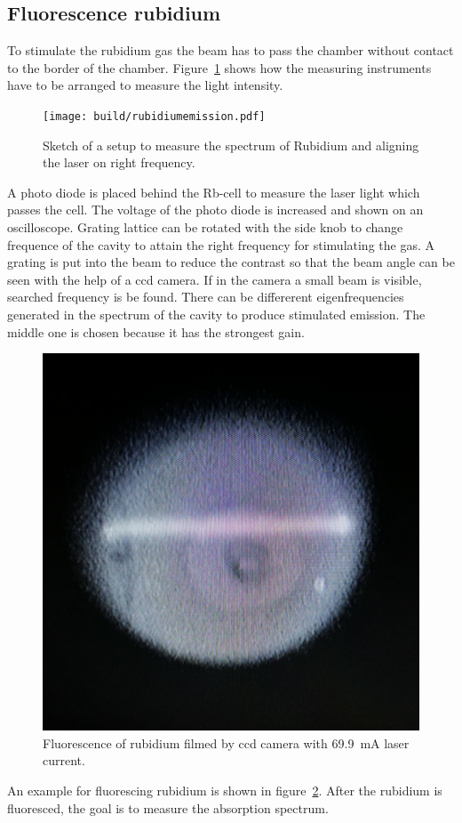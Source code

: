 \subsection{Fluorescence rubidium}%
\label{sub:anregen_rubidium}

To stimulate the rubidium gas the beam has to pass the chamber without contact
to the border of the chamber. 
Figure~\ref{fig:hole_emission} shows how the measuring instruments have to be
arranged to measure the light intensity.
\begin{figure}[h]
		\centering
		\texttt{[image: build/rubidiumemission.pdf]}
		\caption{Sketch of a setup to measure the spectrum of Rubidium and
		aligning the laser on right frequency.\cite{anleitung}}%
		\label{fig:hole_emission}
\end{figure}
A photo diode is placed behind the Rb-cell to measure the laser light which
passes the cell.
The voltage of the photo diode is increased and shown on an oscilloscope. 
Grating lattice can be rotated with the side knob to change frequence of the
cavity to attain the right frequency for stimulating the gas.
A grating is put into the beam to reduce the contrast so that the beam angle
can be seen with the help of a ccd camera. 
If in the camera a small beam is visible, searched frequency is be found. 
There can be differerent eigenfrequencies generated in the spectrum of the
cavity to produce stimulated emission.
The middle one is chosen because it has the strongest gain.
\begin{figure}[h]
		\centering
		\includegraphics[width=0.4\linewidth]{./content/pictures/fluorescence.jpg}
		\caption{Fluorescence of rubidium filmed by ccd camera with 
				\SI{69.9}{\milli\ampere} laser current.}%
		\label{fig:ionized}
\end{figure}
An example for fluorescing rubidium is shown in figure~\ref{fig:ionized}.
After the rubidium is fluoresced, the goal is to measure the absorption spectrum. 


